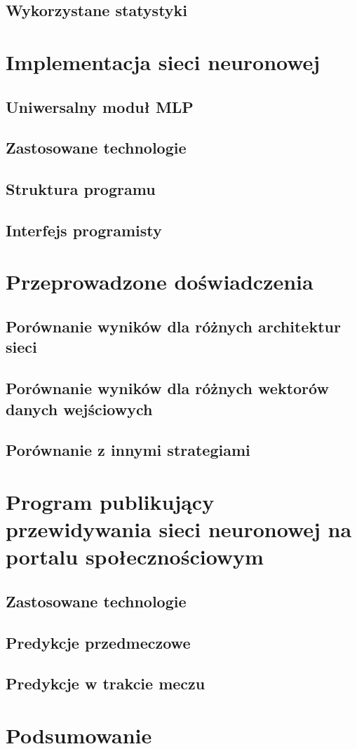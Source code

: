 \section{Wykorzystane statystyki}

\chapter{Implementacja sieci neuronowej}
\section{Uniwersalny moduł MLP}
\section{Zastosowane technologie}
\section{Struktura programu}
\section{Interfejs programisty}

\chapter{Przeprowadzone doświadczenia}
\section{Porównanie wyników dla różnych architektur sieci}
\section{Porównanie wyników dla różnych wektorów danych wejściowych}
\section{Porównanie z innymi strategiami}

\chapter{Program publikujący przewidywania sieci neuronowej na portalu społecznościowym}
\section{Zastosowane technologie}
\section{Predykcje przedmeczowe}
\section{Predykcje w trakcie meczu}

\chapter{Podsumowanie}

